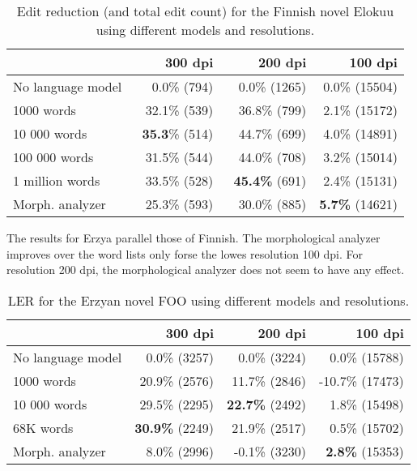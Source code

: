 \documentclass[b5paper]{article}
\begin{document}
\begin{table}[!htb]
\begin{center}
\begin{tabular}{lrrr}
\hline 
                  & 300 dpi & 200 dpi & 100 dpi \\
\hline 
No language model & ~0.0\% (794)          & ~0.0\% (1265)          & 0.0\% (15504)  \\
1000 words        & ~32.1\% (539)  & ~36.8\% (799)        & 2.1\% (15172)           \\
10 000 words      & {\bf ~35.3}\% (514)  & ~44.7\%  (699)  & 4.0\% (14891)          \\
100 000 words     & ~31.5\% (544)   & ~44.0\%  (708)  & 3.2\%  (15014)              \\
1 million words   & ~33.5\% (528)   & {\bf ~45.4\%} (691)  & 2.4\% (15131)          \\
Morph. analyzer   & ~25.3\% (593)    & ~30.0\% (885)     & {\bf 5.7\%} (14621)      \\
\hline 
\end{tabular}
\caption{Edit reduction (and total edit count) for the Finnish novel Elokuu using different models and resolutions.}\label{fin-novel-res}
\end{center}
\end{table}

The results for Erzya parallel those of Finnish. The morphological
analyzer improves over the word lists only forse the lowes resolution
100 dpi. For resolution 200 dpi, the morphological analyzer does not
seem to have any effect.

\begin{table}[!htb]
\begin{center}
\begin{tabular}{lrrr}
\hline 
                  & 300 dpi & 200 dpi & 100 dpi \\
\hline 
No language model &  0.0\% (3257)  &  0.0\% (3224)  &  0.0\% (15788)  \\
1000 words        &  20.9\% (2576)  &  11.7\% (2846)  & -10.7\%  (17473) \\
10 000 words      &  29.5\% (2295)  &   {\bf 22.7\%} (2492)  & 1.8\% (15498)  \\
68K words         &  {\bf 30.9\%} (2249)  &  21.9\% (2517)  & 0.5\% (15702)\\
Morph. analyzer   &  8.0\% (2996)  &  -0.1\% (3230)  & {\bf 2.8\%} (15353)  \\
\hline 
\end{tabular}
\caption{LER for the Erzyan novel FOO using different models and resolutions.}\label{myv-novel-res}
\end{center}
\end{table}
\end{document}
